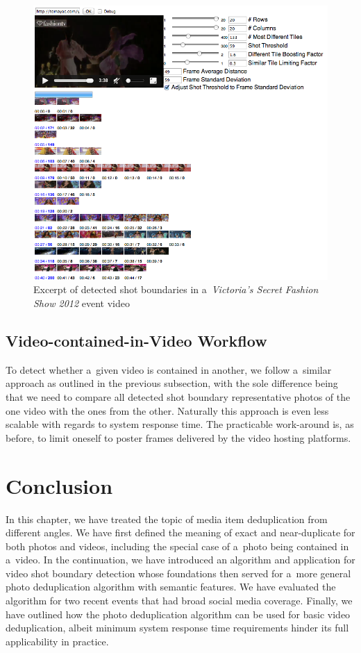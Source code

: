 \begin{figure}[h!]
  \centering
  \includegraphics[width=1.0\linewidth]{./vsfashionshowboundaries.png}
  \caption[Excerpt of detected shot boundaries in an event video]
  {Excerpt of detected shot boundaries in a~\emph{Victoria's Secret Fashion Show 2012} event video}
  \label{fig:vsfashionshowboundaries}
\end{figure}

\subsection{Video-contained-in-Video Workflow}

To detect whether a~given video is contained in another,
we follow a~similar approach as outlined in the previous subsection,
with the sole difference being that we need to compare
all detected shot boundary representative photos of the one video
with the ones from the other.
Naturally this approach is even less scalable
with regards to system response time.
The practicable work-around is, as before, to limit oneself
to poster frames delivered by the video hosting platforms.

\section{Conclusion}

In this chapter, we have treated the topic of media item deduplication
from different angles.
We have first defined the meaning of exact and near-duplicate 
for both photos and videos,
including the special case of a~photo being contained in a~video.
In the continuation, we have introduced an algorithm and application
for video shot boundary detection
whose foundations then served for a~more general
photo deduplication algorithm with semantic features.
We have evaluated the algorithm for two recent events
that had broad social media coverage.
Finally, we have outlined how the photo deduplication algorithm
can be used for basic video deduplication,
albeit minimum system response time requirements
hinder its full applicability in practice.

